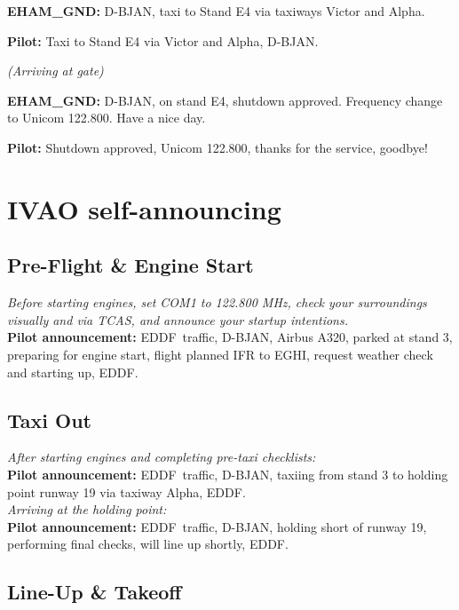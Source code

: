 \documentclass{article}
\newcommand{\callsign}{D-BJAN}
\newcommand{\departure}{EDDF}
\newcommand{\destination}{EGHI}
\begin{document}
\textbf{EHAM\_GND:} \callsign, taxi to Stand E4 via taxiways Victor and Alpha.

\textbf{Pilot:} Taxi to Stand E4 via Victor and Alpha, \callsign.

\textit{(Arriving at gate)}

\textbf{EHAM\_GND:} \callsign, on stand E4, shutdown approved. Frequency change to Unicom 122.800. Have a nice day.

\textbf{Pilot:} Shutdown approved, Unicom 122.800, thanks for the service, goodbye!


\section{IVAO self-announcing}

\subsection*{Pre-Flight \& Engine Start}

\textit{Before starting engines, set COM1 to 122.800 MHz, check your surroundings visually and via TCAS, and announce your startup intentions.} \\

\textbf{Pilot announcement:} \departure~traffic, \callsign, Airbus A320, parked at stand 3, preparing for engine start, flight planned IFR to \destination, request weather check and starting up, \departure.

\subsection*{Taxi Out}

\textit{After starting engines and completing pre-taxi checklists:} \\

\textbf{Pilot announcement:} \departure~traffic, \callsign, taxiing from stand 3 to holding point runway 19 via taxiway Alpha, \departure. \\

\textit{Arriving at the holding point:} \\

\textbf{Pilot announcement:} \departure~traffic, \callsign, holding short of runway 19, performing final checks, will line up shortly, \departure.

\subsection*{Line-Up \& Takeoff}
\end{document}
